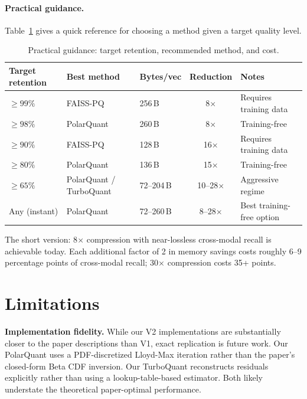 \documentclass[11pt]{article}
\begin{document}
\paragraph{Practical guidance.}
Table~\ref{tab:practical} gives a quick reference for choosing a method given a target quality level.

\begin{table}[h!]
  \centering
  \caption{Practical guidance: target retention, recommended method, and cost.}
  \label{tab:practical}
  \small
  \begin{tabularx}{\linewidth}{lllcX}
    \toprule
    \textbf{Target retention} & \textbf{Best method} & \textbf{Bytes/vec} & \textbf{Reduction} & \textbf{Notes} \\
    \midrule
    $\geq 99\%$ & FAISS-PQ & 256\,B & 8$\times$ & Requires training data \\
    $\geq 98\%$ & PolarQuant & 260\,B & 8$\times$ & Training-free \\
    $\geq 90\%$ & FAISS-PQ & 128\,B & 16$\times$ & Requires training data \\
    $\geq 80\%$ & PolarQuant & 136\,B & 15$\times$ & Training-free \\
    $\geq 65\%$ & PolarQuant / TurboQuant & 72--204\,B & 10--28$\times$ & Aggressive regime \\
    Any (instant) & PolarQuant & 72--260\,B & 8--28$\times$ & Best training-free option \\
    \bottomrule
  \end{tabularx}
\end{table}

The short version: 8$\times$ compression with near-lossless cross-modal recall is achievable today.
Each additional factor of 2 in memory savings costs roughly 6--9 percentage points of cross-modal
recall; 30$\times$ compression costs 35+ points.

\section{Limitations}

\textbf{Implementation fidelity.} While our V2 implementations are substantially closer to the paper
descriptions than V1, exact replication is future work. Our PolarQuant uses a PDF-discretized Lloyd-Max
iteration rather than the paper's closed-form Beta CDF inversion. Our TurboQuant reconstructs residuals
explicitly rather than using a lookup-table-based estimator. Both likely understate the theoretical
paper-optimal performance.
\end{document}
